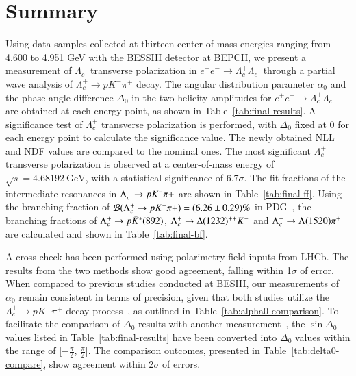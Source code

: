 \clearpage 
\section{Summary}
\label{sec:summary}
Using data samples collected at thirteen center-of-mass energies ranging from 4.600 to 4.951 GeV with the BESSIII detector at BEPCII, we present a measurement of $\Lambda_c^+$ transverse polarization in $e^+e^- \to \Lambda_c^+ \Lambda_c^-$ through a partial wave analysis of $\Lambda_c^+ \to p K^- \pi^+$ decay. The angular distribution parameter $\alpha_0$ and the phase angle difference $\Delta_0$ in the two helicity amplitudes for $e^+e^- \to \Lambda_c^+ \Lambda_c^-$ are obtained at each energy point, as shown in Table~\ref{tab:final-results}. A significance test of $\Lambda_c^+$ transverse polarization is performed, with $\Delta_0$ fixed at 0 for each energy point to calculate the significance value. The newly obtained NLL and NDF values are compared to the nominal ones. The most significant $\Lambda_c^+$ transverse polarization is observed at a center-of-mass energy of $\sqrt{s} = 4.68192\ \text{GeV}$, with a statistical significance of 6.7$\sigma$. The fit fractions of the intermediate resonances in $\Lambda_{c}^{+} \rightarrow p K^-\pi+$ are shown in Table~\ref{tab:final-ff}. Using the branching fraction of $\mathcal{B}(\Lambda_{c}^{+} \rightarrow p K^-\pi+) = (6.26\pm0.29)\%$ in PDG~\cite{Workman:2022ynf}, the branching fractions of $\Lambda_{c}^{+} \rightarrow p\bar{K}^*(892)$, $\Lambda_{c}^{+} \rightarrow \Delta(1232)^{++}K^-$ and $\Lambda_{c}^{+} \rightarrow \Lambda(1520)\pi^+$ are calculated and shown in Table~\ref{tab:final-bf}.

A cross-check has been performed using polarimetry field inputs from LHCb. The results from the two methods show good agreement, falling within 1$\sigma$ of error. When compared to previous studies conducted at BESIII, our measurements of $\alpha_0$ remain consistent in terms of precision, given that both studies utilize the $\Lambda_c^+ \to p K^-\pi^+$ decay process~\cite{BESIII:2017kqg,BESIII:2023rwv}, as outlined in Table~\ref{tab:alpha0-comparison}. To facilitate the comparison of $\Delta_0$ results with another measurement~\cite{ESIIImemo:LcDecayAsy}, the $\sin\Delta_0$ values listed in Table~\ref{tab:final-results} have been converted into $\Delta_0$ values within the range of [$-\frac{\pi}{2}$, $\frac{\pi}{2}$]. The comparison outcomes, presented in Table~\ref{tab:delta0-compare}, show agreement within 2$\sigma$ of errors.

